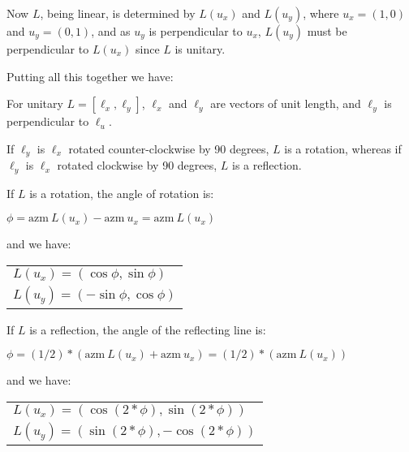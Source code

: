 \documentclass[12pt]{article}
\begin{document}
Now
$L$, being linear, is determined by $L(u_x)$ and $L(u_y)$, where
$u_x=(1,0)$ and $u_y=(0,1)$, and as $u_y$ is perpendicular to
$u_x$, $L(u_y)$ must be perpendicular to $L(u_x)$ since $L$ is unitary.

Putting all this together we have:
\begin{lemma}
For unitary $L=[\ell_x,\ell_y]$, $\ell_x$ and $\ell_y$ are
vectors of unit length, and $\ell_y$ is perpendicular to $\ell_u$.

If $\ell_y$ is $\ell_x$ rotated counter-clockwise
by 90 degrees, $L$ is a rotation, whereas if
$\ell_y$ is $\ell_x$ rotated clockwise
by 90 degrees, $L$ is a reflection.
\end{lemma}

If $L$ is a rotation, the angle of rotation is: \\
\centerline{$\phi = \mathrm{azm}~L(u_x) - \mathrm{azm}~u_x =
             \mathrm{azm}~L(u_x)$}
and we have: \begin{tabular}[t]{l}
             $L(u_x)=(\cos\phi,\sin\phi)$ \\
             $L(u_y)=(-\sin\phi,\cos\phi)$ \\
	     \end{tabular}

If $L$ is a reflection, the angle of the reflecting line is: \\
\centerline{$\phi = (1/2)*(\mathrm{azm}~L(u_x) + \mathrm{azm}~u_x)
                  = (1/2)*(\mathrm{azm}~L(u_x))$}
and we have: \begin{tabular}[t]{l}
             $L(u_x)=(\cos(2*\phi),\sin(2*\phi))$ \\
             $L(u_y)=(\sin(2*\phi),-\cos(2*\phi))$ \\
	     \end{tabular}
\end{document}

